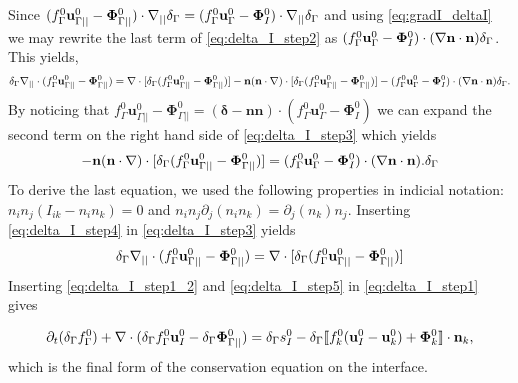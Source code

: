 \documentclass[11pt]{My_preprint}
\begin{document}
Since $ (f_\Gamma^0 \textbf{u}_{\Gamma||}^0 - \mathbf{\Phi}_{\Gamma||}^0 )\cdot\mathbf{\nabla}_{||}\delta_\Gamma  = (f_\Gamma^0 \textbf{u}_\Gamma^0 - \mathbf{\Phi}_{I}^0 )\cdot\mathbf{\nabla}_{||}\delta_\Gamma$ and using \ref{eq:gradI_deltaI} we may rewrite the last term of \ref{eq:delta_I_step2} as $(f_\Gamma^0 \textbf{u}_\Gamma^0 - \mathbf{\Phi}_{I}^0 )\cdot(\mathbf{\nabla} \textbf{n}\cdot \textbf{n}) \delta_\Gamma$. This yields,
\begin{equation}
    \delta_\Gamma \divI (f_\Gamma^0 \textbf{u}_{\Gamma||}^0
    - \mathbf{\Phi}_{\Gamma||}^0 ) = 
    \div [\delta_\Gamma (f_\Gamma^0 \textbf{u}_{\Gamma||}^0
    - \mathbf{\Phi}_{\Gamma||}^0 )]
    - \textbf{n}(\textbf{n}\cdot\grad)\cdot [\delta_\Gamma (f_\Gamma^0 \textbf{u}_{\Gamma||}^0
    - \mathbf{\Phi}_{\Gamma||}^0 )]
    - (f_\Gamma^0 \textbf{u}_\Gamma^0 - \mathbf{\Phi}_{I}^0 )\cdot(\grad \textbf{n}\cdot \textbf{n}) \delta_\Gamma.
\label{eq:delta_I_step3}
\end{equation}
By noticing that $f_\Gamma^0 \textbf{u}_{\Gamma||}^0
    - \mathbf{\Phi}_{\Gamma||}^0 = (\bm\delta - \textbf{nn})\cdot (f_\Gamma^0 \textbf{u}_\Gamma^0
    - \mathbf{\Phi}_{I}^0 )$ we can expand the second term on the right hand side of \ref{eq:delta_I_step3} which yields
\begin{equation}
    - \textbf{n}(\textbf{n}\cdot\grad)\cdot [\delta_\Gamma (f_\Gamma^0 \textbf{u}_{\Gamma||}^0
    - \mathbf{\Phi}_{\Gamma||}^0 )]
    = (f_\Gamma^0 \textbf{u}_\Gamma^0 - \mathbf{\Phi}_{I}^0 )\cdot(\grad \textbf{n}\cdot \textbf{n}). \delta_\Gamma \label{eq:delta_I_step4}
\end{equation}
To derive the last equation, we used the following properties in indicial notation: $n_in_j(I_{ik}-n_in_k) =0$ and $n_in_j\partial_{j}(n_in_k)=\partial_{j}(n_k)n_j$. Inserting \ref{eq:delta_I_step4} in \ref{eq:delta_I_step3} yields
\begin{equation}
    \delta_\Gamma \divI (f_\Gamma^0 \textbf{u}_{\Gamma||}^0
    - \mathbf{\Phi}_{\Gamma||}^0 ) = 
    \div [\delta_\Gamma (f_\Gamma^0 \textbf{u}_{\Gamma||}^0
    - \mathbf{\Phi}_{\Gamma||}^0 )]
\label{eq:delta_I_step5}
\end{equation}
Inserting \ref{eq:delta_I_step1_2} and \ref{eq:delta_I_step5} in \ref{eq:delta_I_step1} gives

\begin{equation}
    \partial_t (\delta_\Gamma f_\Gamma^0)  
    + \mathbf{\nabla}\cdot (
        \delta_\Gamma f_\Gamma^0 \textbf{u}_I^0
        - \delta_\Gamma \mathbf{\Phi}_{\Gamma||}^0 
        )
    = 
    \delta_\Gamma s_I^0
    - \delta_\Gamma\llbracket 
    f_k^0 (\textbf{u}_I^0 - \textbf{u}_k^0)
    + \mathbf{\Phi}_k^0 \rrbracket \cdot \textbf{n}_k,
\end{equation}
which is the final form of the conservation equation on the interface.
\end{document}
